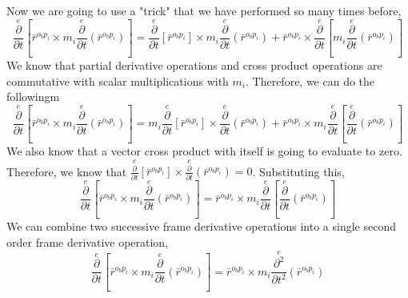  Now we are going to use a "trick" that we have performed so many times before,
$$\overset{e}{\frac{\partial}{\partial t}}\left[ \bar{r}^{o_{b}p_{i}}\times m_{i}\overset{e}{\frac{\partial}{\partial t}}\left(\bar{r}^{o_{b}p_{i}}\right) \right] = 
\overset{e}{\frac{\partial}{\partial t}}\left[\bar{r}^{o_{b}p_{i}}\right]\times m_{i}\overset{e}{\frac{\partial}{\partial t}}\left(\bar{r}^{o_{b}p_{i}}\right) + 
\bar{r}^{o_{b}p_{i}}\times\overset{e}{\frac{\partial}{\partial t}}\left[m_{i}\overset{e}{\frac{\partial}{\partial t}}\left(\bar{r}^{o_{b}p_{i}}\right)\right]$$
We know that partial derivative operations and cross product operations are commutative with scalar multiplications with $m_{i}$.
Therefore, we can do the followingm
$$\overset{e}{\frac{\partial}{\partial t}}\left[ \bar{r}^{o_{b}p_{i}}\times m_{i}\overset{e}{\frac{\partial}{\partial t}}\left(\bar{r}^{o_{b}p_{i}}\right) \right] = 
m_{i}\overset{e}{\frac{\partial}{\partial t}}\left[\bar{r}^{o_{b}p_{i}}\right]\times\overset{e}{\frac{\partial}{\partial t}}\left(\bar{r}^{o_{b}p_{i}}\right) + 
\bar{r}^{o_{b}p_{i}}\times m_{i}\overset{e}{\frac{\partial}{\partial t}}\left[\overset{e}{\frac{\partial}{\partial t}}\left(\bar{r}^{o_{b}p_{i}}\right)\right]$$
We also know that a vector cross product with itself is going to evaluate to zero.
Therefore, we know that $\displaystyle \overset{e}{\frac{\partial}{\partial t}}\left[\bar{r}^{o_{b}p_{i}}\right]\times\overset{e}{\frac{\partial}{\partial t}}\left(\bar{r}^{o_{b}p_{i}}\right) = 0$.
Substituting this,
$$\overset{e}{\frac{\partial}{\partial t}}\left[ \bar{r}^{o_{b}p_{i}}\times m_{i}\overset{e}{\frac{\partial}{\partial t}}\left(\bar{r}^{o_{b}p_{i}}\right) \right] = 
\bar{r}^{o_{b}p_{i}}\times m_{i}\overset{e}{\frac{\partial}{\partial t}}\left[\overset{e}{\frac{\partial}{\partial t}}\left(\bar{r}^{o_{b}p_{i}}\right)\right]$$
We can combine two successive frame derivative operations into a single second order frame derivative operation,
$$\overset{e}{\frac{\partial}{\partial t}}\left[ \bar{r}^{o_{b}p_{i}}\times m_{i}\overset{e}{\frac{\partial}{\partial t}}\left(\bar{r}^{o_{b}p_{i}}\right) \right] = 
\bar{r}^{o_{b}p_{i}}\times m_{i}\overset{e}{\frac{\partial^{2}}{\partial t^{2}}}\left(\bar{r}^{o_{b}p_{i}}\right)$$

